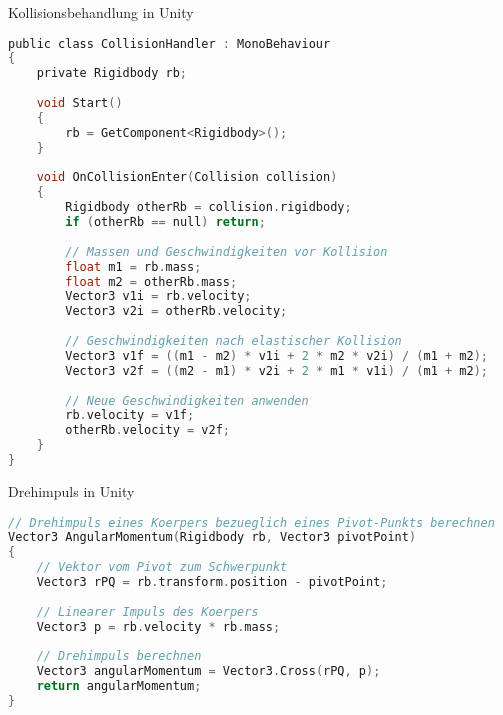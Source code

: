 \begin{code}{Kollisionsbehandlung in Unity}
\begin{lstlisting}[language=C, style=basesmol]
public class CollisionHandler : MonoBehaviour 
{
    private Rigidbody rb;
    
    void Start() 
    {
        rb = GetComponent<Rigidbody>();
    }
    
    void OnCollisionEnter(Collision collision) 
    {
        Rigidbody otherRb = collision.rigidbody;
        if (otherRb == null) return;
        
        // Massen und Geschwindigkeiten vor Kollision
        float m1 = rb.mass;
        float m2 = otherRb.mass;
        Vector3 v1i = rb.velocity;
        Vector3 v2i = otherRb.velocity;
        
        // Geschwindigkeiten nach elastischer Kollision
        Vector3 v1f = ((m1 - m2) * v1i + 2 * m2 * v2i) / (m1 + m2);
        Vector3 v2f = ((m2 - m1) * v2i + 2 * m1 * v1i) / (m1 + m2);
        
        // Neue Geschwindigkeiten anwenden
        rb.velocity = v1f;
        otherRb.velocity = v2f;
    }
}
\end{lstlisting}
\end{code}

\begin{code}{Drehimpuls in Unity}
\begin{lstlisting}[language=C, style=basesmol]
// Drehimpuls eines Koerpers bezueglich eines Pivot-Punkts berechnen
Vector3 AngularMomentum(Rigidbody rb, Vector3 pivotPoint) 
{
    // Vektor vom Pivot zum Schwerpunkt
    Vector3 rPQ = rb.transform.position - pivotPoint;
    
    // Linearer Impuls des Koerpers
    Vector3 p = rb.velocity * rb.mass;
    
    // Drehimpuls berechnen
    Vector3 angularMomentum = Vector3.Cross(rPQ, p);
    return angularMomentum;
}
\end{lstlisting}
\end{code}

